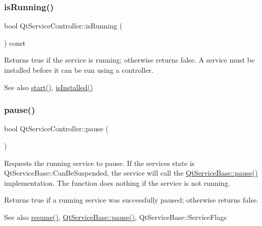 \subsubsection{\texorpdfstring{is\+Running()}{isRunning()}}
{\footnotesize\ttfamily bool Qt\+Service\+Controller\+::is\+Running (\begin{DoxyParamCaption}{ }\end{DoxyParamCaption}) const}

Returns true if the service is running; otherwise returns false. A service must be installed before it can be run using a controller.

\begin{DoxySeeAlso}{See also}
\hyperlink{class_qt_service_controller_a5e9d6da5081d70f31611456d0ef0687e}{start()}, \hyperlink{class_qt_service_controller_a7e36fb18a273118709faf22f732feac4}{is\+Installed()} 
\end{DoxySeeAlso}
\mbox{\label{class_qt_service_controller_aeee2fcc9469f77c7ed8a7955c4fa3a07}} 
\subsubsection{\texorpdfstring{pause()}{pause()}}
{\footnotesize\ttfamily bool Qt\+Service\+Controller\+::pause (\begin{DoxyParamCaption}{ }\end{DoxyParamCaption})}

Requests the running service to pause. If the service\textquotesingle{}s state is Qt\+Service\+Base\+::\+Can\+Be\+Suspended, the service will call the \hyperlink{class_qt_service_base_a43215a7c5c047d30bcf4f697e6691f89}{Qt\+Service\+Base\+::pause()} implementation. The function does nothing if the service is not running.

Returns true if a running service was successfully paused; otherwise returns false.

\begin{DoxySeeAlso}{See also}
\hyperlink{class_qt_service_controller_a2d71eab6146427fc7b431386bf72eaec}{resume()}, \hyperlink{class_qt_service_base_a43215a7c5c047d30bcf4f697e6691f89}{Qt\+Service\+Base\+::pause()}, Qt\+Service\+Base\+::\+Service\+Flags 
\end{DoxySeeAlso}
\mbox{\label{class_qt_service_controller_a2d71eab6146427fc7b431386bf72eaec}} 
